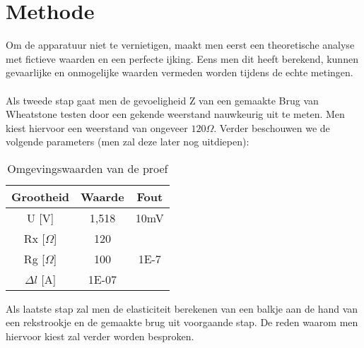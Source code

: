 \section{Methode}

Om de apparatuur niet te vernietigen, maakt men
eerst een theoretische analyse met fictieve waarden en een 
perfecte ijking. Eens men dit heeft berekend, kunnen
gevaarlijke en onmogelijke waarden vermeden worden tijdens de echte metingen.
\\ \\
Als tweede stap gaat men de gevoeligheid Z van een gemaakte Brug
van Wheatstone testen door een gekende weerstand nauwkeurig uit
te meten. Men kiest hiervoor een weerstand van
ongeveer $120 \Omega$. Verder beschouwen we de volgende parameters
(men zal deze later nog uitdiepen):

\begin{table}[H]
    \caption{Omgevingswaarden van de proef}
    \label{tab:omgevingswaarden}
    \centering
    \begin{tabular}{| c | c | c |}
        \hline
        Grootheid       & Waarde    & Fout \\ \hline
        U [V]           & 1,518     & 10mV \\ \hline
        Rx [$\Omega$]   & 120       &      \\ \hline
        Rg [$\Omega$]   & 100       & 1E-7 \\ \hline
        $\Delta l$ [A]  & 1E-07     &      \\ \hline
    \end{tabular}
\end{table}

Als laatste stap zal men de elasticiteit berekenen van
een balkje aan de hand van een rekstrookje en de gemaakte brug
uit voorgaande stap. De reden waarom men hiervoor kiest zal
verder worden besproken.
